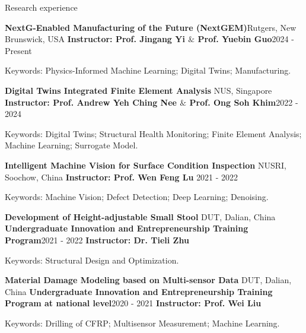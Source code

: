 \documentclass{resume} %
\begin{document}
\begin{rSection}{Research experience}
\begin{rSubsection}{\bf NextG-Enabled Manufacturing of the Future (NextGEM)}{Rutgers, New Brunswick, USA}
	{\bf Instructor: Prof. Jingang Yi $\&$  Prof. Yuebin Guo}{2024 - Present}
	\item {Keywords: Physics-Informed Machine Learning; Digital Twins; Manufacturing.}\\
\end{rSubsection}

\begin{rSubsection}{\bf Digital Twins Integrated Finite Element Analysis  }{NUS, Singapore}
	{\bf Instructor: Prof. Andrew Yeh Ching Nee $\&$  Prof. Ong Soh Khim}{2022 - 2024}
	\item {Keywords: Digital Twins; Structural Health Monitoring; Finite Element Analysis; Machine Learning; Surrogate Model.}\\
\end{rSubsection}

\begin{rSubsection}{\bf Intelligent Machine Vision for Surface Condition Inspection  }{NUSRI, Soochow, China}
{\bf Instructor: Prof. Wen Feng Lu  }{2021 - 2022}
	\item {Keywords: Machine Vision; Defect Detection; Deep Learning; Denoising.}\\
\end{rSubsection}

\begin{rSubsubsection}{\bf Development of Height-adjustable Small Stool  }{DUT, Dalian, China}
{\bf Undergraduate Innovation and Entrepreneurship Training Program}{2021 - 2022}
{\bf Instructor: Dr. Tieli Zhu}{ }
	\item {Keywords: Structural Design and Optimization.}\\
\end{rSubsubsection}


\begin{rSubsubsection}{\bf Material Damage Modeling based on Multi-sensor Data  }{DUT, Dalian, China}
	{\bf Undergraduate Innovation and Entrepreneurship Training Program at national level}{2020 - 2021}
	{\bf Instructor: Prof. Wei Liu}{ }
	\item {Keywords: Drilling of CFRP; Multisensor Measurement; Machine Learning.}\\
\end{rSubsubsection}
\end{rSection}
\end{document}
